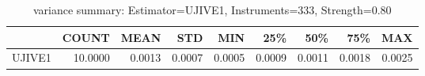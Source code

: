 \begin{table}[ht]
\centering
\caption{variance summary: Estimator=UJIVE1, Instruments=333, Strength=0.80}
\begin{tabular}{lrrrrrrrr}
\toprule
 & COUNT & MEAN & STD & MIN & 25\% & 50\% & 75\% & MAX \\
\midrule
UJIVE1 & 10.0000 & 0.0013 & 0.0007 & 0.0005 & 0.0009 & 0.0011 & 0.0018 & 0.0025 \\
\bottomrule
\end{tabular}
\end{table}
